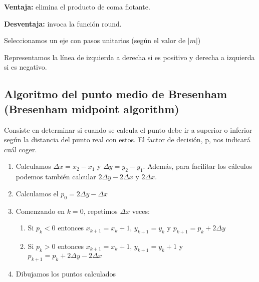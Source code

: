 \textbf{Ventaja:} elimina el producto de coma flotante.

\textbf{Desventaja:} invoca la función round.

Seleccionamos un eje con pasos unitarios (según el valor de $|m|$)

Representamos la línea de izquierda a derecha si es positivo y derecha a izquierda si es negativo.

\subsection{Algoritmo del punto medio de Bresenham (Bresenham midpoint algorithm)}
Consiste en determinar si cuando se calcula el punto debe ir a superior o inferior según la distancia del punto real con estos. El factor de decisión, p, nos indicará cuál coger.

\begin{enumerate}
	\item Calculamos $\Delta x = x_2 -x_1$ y $\Delta y = y_2 -y_1$. Además, para facilitar los cálculos podemos también calcular $2\Delta y - 2 \Delta x$ y $2 \Delta x$.
	\item Calculamos el $p_0=2\Delta y - \Delta x$
	\item Comenzando en $k=0$, repetimos $\Delta x$ veces:
	      \begin{enumerate}
		      \item Si $p_k < 0$ entonces $x_{k+1}=x_k+1$, $y_{k+1}=y_k$ y $p_{k+1}=p_k+2\Delta y$
		      \item Si $p_k > 0$ entonces $x_{k+1}=x_k+1$, $y_{k+1}=y_k+1$ y $p_{k+1}=p_k+2\Delta y - 2 \Delta x$
	      \end{enumerate}
	\item Dibujamos los puntos calculados
\end{enumerate}